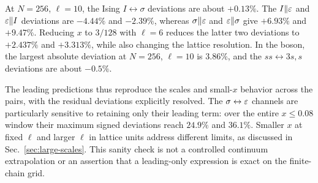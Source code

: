 \begin{table}[htbp]\centering\scriptsize

\caption{Ising primary relative entropy sanity check for all six
directions under the critical periodic Hamiltonian
$H=-\sum XX-\sum Z$. The theoretical coefficient $B_{ab}$ multiplies
$x^\alpha$, including its power of $\pi$. Here $S_{10}$ and $S_{10}^{\rm LO}$ are respectively
the direct numerical entropy and its analytical CFT leading-order prediction at
$N=256$, $\ell=10$, $x=5/128$; both use natural logarithms.
$\delta_6$ and $\delta_{10}$ are signed deviations at $N=256$ for
$\ell=6$ and ten, respectively. $E_m$ uses all $m=51$ geometries with
$x\leq0.08$ and is defined by Eq.~\eqref{eq:primary-comparison-metrics}.
All primaries and spectral checks are specified in
Sec.~\ref{sec:primary-numerics}; every coefficient is fixed analytically.}
\label{tab:ising-primary-entropy}
\end{table}
\begin{table}[htbp]\centering\scriptsize

\caption{Compact-boson primary relative entropy for all six directions,
with the same geometry and indicator definitions as
Table~\ref{tab:ising-primary-entropy}. The normalized vertex/Jastrow
states have charges in Eq.~\eqref{eq:primary-boson-charges}, $q=2$,
$z_j=e^{2\pi i j/N}$, $w_1=0$, $W=10^8$, and no orthogonalization.
All rows have fixed $\alpha=2$; $B_{ab}=\kappa_{ab}\pi^2/3$ follows from
Eq.~\eqref{eq:primary-boson-leading}. The data use the primary target
$\rho_A^b$, with no mixture.}
\label{tab:boson-primary-entropy}
\end{table}

At $N=256$, $\ell=10$, the Ising $I\leftrightarrow\sigma$ deviations
are about $+0.13\%$. The $I\Vert\varepsilon$ and $\varepsilon\Vert I$ deviations
are $-4.44\%$ and $-2.39\%$, whereas
$\sigma\Vert\varepsilon$ and $\varepsilon\Vert\sigma$ give $+6.93\%$ and
$+9.47\%$. Reducing $x$ to $3/128$ with $\ell=6$ reduces the latter
two deviations to $+2.437\%$ and $+3.313\%$, while also changing the
lattice resolution. In the boson, the largest absolute deviation at
$N=256$, $\ell=10$ is $3.86\%$, and the
$ss\leftrightarrow3s,s$ deviations are about $-0.5\%$.

The leading predictions thus reproduce the scales and small-$x$
behavior across the pairs, with the residual deviations explicitly
resolved. The $\sigma\leftrightarrow\varepsilon$ channels are particularly
sensitive to retaining only their leading term: over the entire
$x\leq0.08$ window their maximum signed deviations reach $24.9\%$
and $36.1\%$. Smaller $x$ at fixed $\ell$ and larger $\ell$ in lattice
units address different limits, as discussed in
Sec.~\ref{sec:large-scales}. This sanity check is not a controlled
continuum extrapolation or an assertion that a leading-only expression
is exact on the finite-chain grid.

